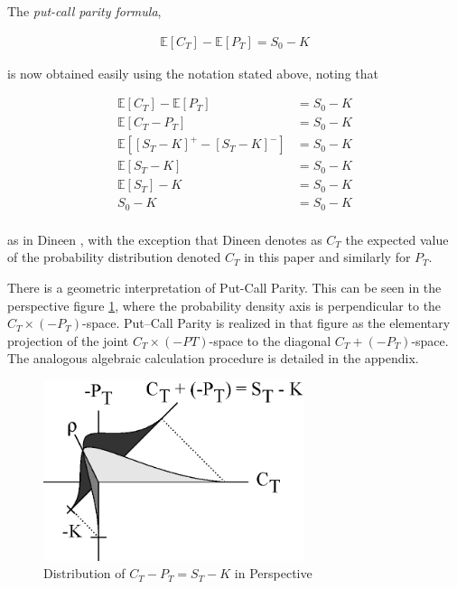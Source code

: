 The \emph{put-call parity formula},

\begin{align*}
\mathbb{E}[C_T] - \mathbb{E}[P_T] = S_0 - K
\end{align*}

is now obtained easily using the notation stated above, noting that

\begin{align*}
\mathbb{E}[C_T] - \mathbb{E}[P_T] &= S_0 - K\\
\mathbb{E}[C_T - P_T] &= S_0 - K\\
\mathbb{E}[[S_T - K]^+ - [S_T - K]^-] &= S_0 - K\\
\mathbb{E}[S_T - K] &= S_0 - K\\
\mathbb{E}[S_T] - K &= S_0 - K\\
S_0 - K &= S_0 - K\\
\end{align*}

as in Dineen \cite{dineen00}, with the exception that Dineen \cite{dineen00} denotes as $C_T$ the expected value of the probability distribution denoted $C_T$ in this paper and similarly for $P_T$. 

There is a geometric interpretation of Put-Call Parity. This can be seen in the perspective figure \ref{fig:CP_addition}, where the probability density axis is perpendicular to the $C_T \times (−P_T)$-space. Put–Call Parity is realized in that figure as the elementary projection of the joint $C_T \times (−PT)$-space to the diagonal $C_T + (−P_T)$-space. The analogous algebraic calculation procedure is detailed in the appendix.

\begin{figure}
  \centering
  \includegraphics[width=3in]{Images/CP_addition.eps}
  \caption[Distribution of Put-Call Parity in Perspective]
          {Distribution of $C_T - P_T = S_T - K$ in Perspective}
  \label{fig:CP_addition}
\end{figure}


